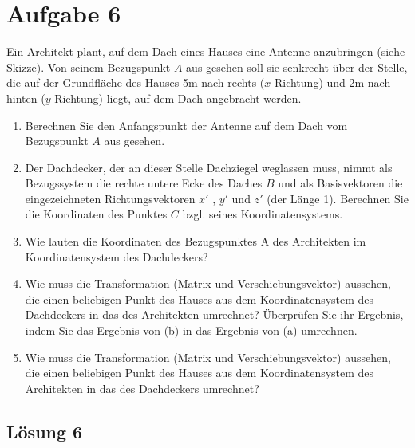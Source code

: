 \documentclass[main.tex]{subfiles}
\begin{document}
\section{Aufgabe 6}
Ein Architekt plant, auf dem Dach eines Hauses eine Antenne anzubringen (siehe Skizze). 
Von seinem Bezugspunkt $A$ aus gesehen soll sie senkrecht über der Stelle, die auf der Grundfläche des Hauses 5m nach rechts ($x$-Richtung) und 2m nach
hinten ($y$-Richtung) liegt, auf dem Dach angebracht werden.

\begin{enumerate}
    \item Berechnen Sie den Anfangspunkt der Antenne auf dem Dach vom Bezugspunkt $A$ aus gesehen.
    \item  Der Dachdecker, der an dieser Stelle Dachziegel weglassen muss, nimmt als Bezugssystem die rechte untere Ecke des Daches $B$ und als Basisvektoren die eingezeichneten Richtungsvektoren $x'$ , $y'$ und $z'$ (der Länge 1). 
    Berechnen Sie die Koordinaten des Punktes $C$ bzgl. seines Koordinatensystems.
    \item Wie lauten die Koordinaten des Bezugspunktes A des Architekten im Koordinatensystem des Dachdeckers?
    \item Wie muss die Transformation (Matrix und Verschiebungsvektor) aussehen, die einen beliebigen Punkt des Hauses aus dem Koordinatensystem des Dachdeckers in das des Architekten umrechnet? 
    Überprüfen Sie ihr Ergebnis, indem Sie das Ergebnis von (b) in das Ergebnis von (a) umrechnen.
    \item Wie muss die Transformation (Matrix und Verschiebungsvektor) aussehen, die einen beliebigen Punkt des Hauses aus dem Koordinatensystem des Architekten in das des Dachdeckers umrechnet?
\end{enumerate}

\subsection{Lösung 6}
\end{document}
